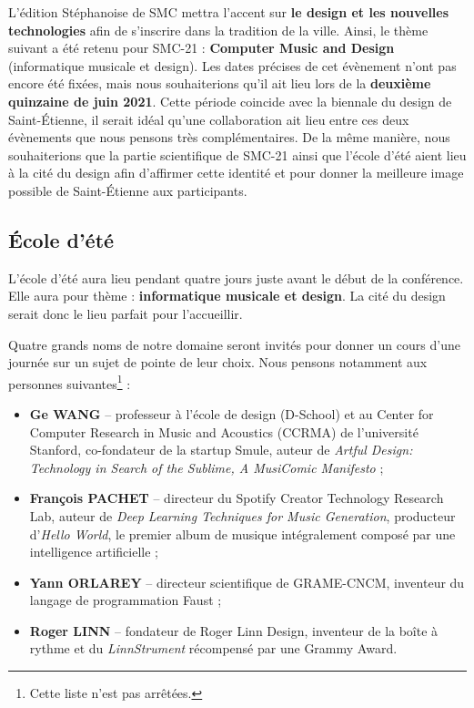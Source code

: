 \documentclass[fontsize=12pt]{scrartcl} %
\numberwithin{equation}{section} %
\numberwithin{figure}{section} %
\numberwithin{table}{section} %
\begin{document}
L'édition Stéphanoise de SMC mettra l'accent sur \textbf{le design et les nouvelles technologies} afin de s'inscrire dans la tradition de la ville. Ainsi, le thème suivant a été retenu pour SMC-21 : \textbf{Computer Music and Design} (informatique musicale et design). Les dates précises de cet évènement n'ont pas encore été fixées, mais nous souhaiterions qu'il ait lieu lors de la \textbf{deuxième quinzaine de juin 2021}. Cette période coincide avec la biennale du design de Saint-Étienne, il serait idéal qu'une collaboration ait lieu entre ces deux évènements que nous pensons très complémentaires. De la même manière, nous souhaiterions que la partie scientifique de SMC-21 ainsi que l'école d'été aient lieu à la cité du design afin d'affirmer cette identité et pour donner la meilleure image possible de Saint-Étienne aux participants. 

\subsection{École d'été}
\label{subsec:ss}

L'école d'été aura lieu pendant quatre jours juste avant le début de la conférence. Elle aura pour thème : \textbf{informatique musicale et design}. La cité du design serait donc le lieu parfait pour l'accueillir.

Quatre grands noms de notre domaine seront invités pour donner un cours d'une journée sur un sujet de pointe de leur choix. Nous pensons notamment aux personnes suivantes\footnote{Cette liste n'est pas arrêtées.} :

\begin{itemize}
  \item \textbf{Ge WANG} -- professeur à l'école de design (D-School) et au Center for Computer Research in Music and Acoustics (CCRMA) de l'université Stanford, co-fondateur de la startup Smule, auteur de \textit{Artful Design: Technology in Search of the Sublime, A MusiComic Manifesto} ;
  \item \textbf{François PACHET} -- directeur du Spotify Creator Technology Research Lab, auteur de \textit{Deep Learning Techniques for Music Generation}, producteur d'\textit{Hello World}, le premier album de musique intégralement composé par une intelligence artificielle ;
  \item \textbf{Yann ORLAREY} -- directeur scientifique de GRAME-CNCM, inventeur du langage de programmation Faust ;
  \item \textbf{Roger LINN} -- fondateur de Roger Linn Design, inventeur de la boîte à rythme et du \textit{LinnStrument} récompensé par une Grammy Award.
\end{itemize} 
\end{document}
